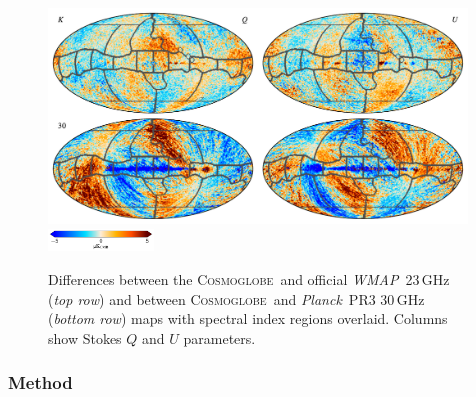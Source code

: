 \documentclass[twocolumn]{../../common/aa}
\def\WMAP{\emph{WMAP}}
\def\Planck{\emph{Planck}}
\newcommand{\cosmoglobe}{\textsc{Cosmoglobe}}
\begin{document}
\begin{figure}
	\centering
	\includegraphics[width=0.99\textwidth]{figures/CG_diff_regions.pdf}\\
        \includegraphics[width=0.25\textwidth]{figures/cbar_5uK.pdf}
	\caption{Differences between the \cosmoglobe\ and official \WMAP\ 23\,GHz (\emph{top row}) and between \cosmoglobe\ and \Planck\ PR3 30\,GHz (\emph{bottom row}) maps with spectral index regions overlaid. Columns show Stokes $Q$ and $U$ parameters.
		}
       \label{fig:diff_regions}
\end{figure}


\subsubsection{Method}
\label{sec:tt_plot_method}
\end{document}

